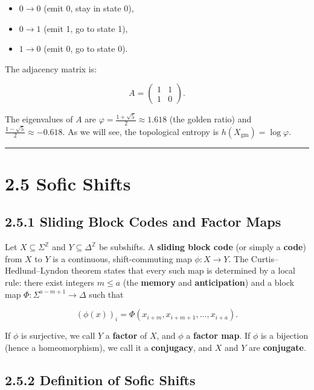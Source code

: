 \begin{itemize}
  \item $0 \to 0$ (emit 0, stay in state 0),
  \item $0 \to 1$ (emit 1, go to state 1),
  \item $1 \to 0$ (emit 0, go to state 0).
\end{itemize}

The adjacency matrix is:

\[
A = \begin{pmatrix} 1 & 1 \\ 1 & 0 \end{pmatrix}.
\]

The eigenvalues of $A$ are $\varphi = \frac{1 + \sqrt{5}}{2} \approx 1.618$ (the golden ratio) and $\frac{1 - \sqrt{5}}{2} \approx -0.618$. As we will see, the topological entropy is $h(X_{\text{gm}}) = \log \varphi$.

\bigskip\hrule\bigskip

\section{2.5 Sofic Shifts}

\subsection{2.5.1 Sliding Block Codes and Factor Maps}

\begin{definition}
Let $X \subseteq \Sigma^{\mathbb{Z}}$ and $Y \subseteq \Delta^{\mathbb{Z}}$ be subshifts. A \textbf{sliding block code} (or simply a \textbf{code}) from $X$ to $Y$ is a continuous, shift-commuting map $\phi : X \to Y$. The Curtis--Hedlund--Lyndon theorem states that every such map is determined by a local rule: there exist integers $m \leq a$ (the \textbf{memory} and \textbf{anticipation}) and a block map $\Phi : \Sigma^{a - m + 1} \to \Delta$ such that

\[
(\phi(x))_i = \Phi(x_{i+m}, x_{i+m+1}, \ldots, x_{i+a}).
\]

If $\phi$ is surjective, we call $Y$ a \textbf{factor} of $X$, and $\phi$ a \textbf{factor map}. If $\phi$ is a bijection (hence a homeomorphism), we call it a \textbf{conjugacy}, and $X$ and $Y$ are \textbf{conjugate}.
\end{definition}

\subsection{2.5.2 Definition of Sofic Shifts}

